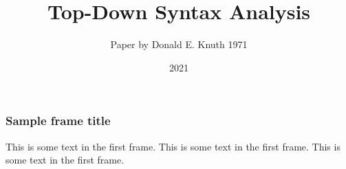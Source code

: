 \documentclass{beamer}
\title{Top-Down Syntax Analysis}
\author{Paper by Donald E. Knuth 1971}
\institute{???}
\date{2021}
\begin{document}
\frame{\titlepage}

\begin{frame}
\frametitle{Sample frame title}
This is some text in the first frame. This is some text in the first frame. This is some text in the first frame.
\end{frame}
\end{document}
